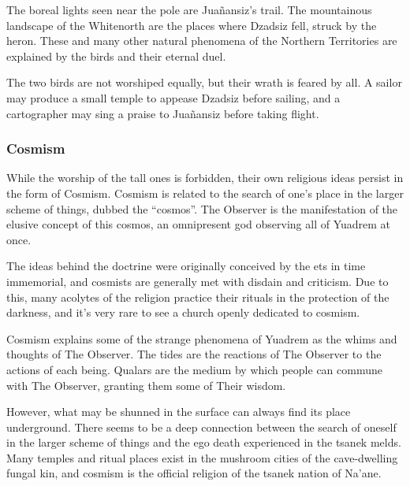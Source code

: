 The boreal lights seen near the pole are Jua\~nansiz's trail.
The mountainous landscape of the Whitenorth are the places where Dzadsiz fell, struck by the heron.
These and many other natural phenomena of the Northern Territories are explained by the birds and their eternal duel.

The two birds are not worshiped equally, but their wrath is feared by all.
A sailor may produce a small temple to appease Dzadsiz before sailing, and a cartographer may sing a praise to Jua\~nansiz before taking flight.

\subsubsection{Cosmism}
While the worship of the tall ones is forbidden, their own religious ideas persist in the form of Cosmism.
Cosmism is related to the search of one's place in the larger scheme of things, dubbed the ``cosmos''.
The Observer is the manifestation of the elusive concept of this cosmos, an omnipresent god observing all of Yuadrem at once.

The ideas behind the doctrine were originally conceived by the ets in time immemorial, and cosmists are generally met with disdain and criticism.
Due to this, many acolytes of the religion practice their rituals in the protection of the darkness, and it's very rare to see a church openly dedicated to cosmism.

Cosmism explains some of the strange phenomena of Yuadrem as the whims and thoughts of The Observer.
The tides are the reactions of The Observer to the actions of each being.
Qualars are the medium by which people can commune with The Observer, granting them some of Their wisdom.


However, what may be shunned in the surface can always find its place underground.
There seems to be a deep connection between the search of oneself in the larger scheme of things and the ego death experienced in the tsanek melds.
Many temples and ritual places exist in the mushroom cities of the cave-dwelling fungal kin, and cosmism is the official religion of the tsanek nation of Na'ane.
